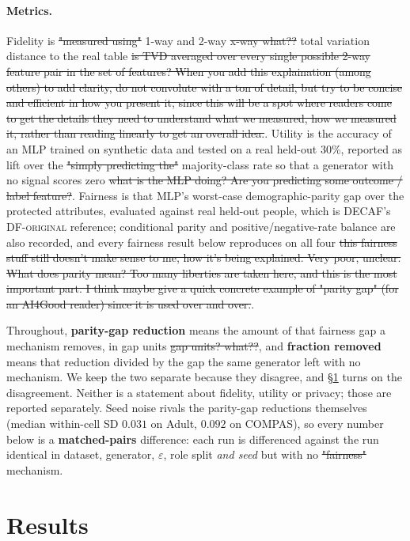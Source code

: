 \documentclass{article}
\begin{document}
\paragraph{Metrics.}
Fidelity is \st{"measured using"} 1-way and 2-way \st{x-way what??} total variation distance to the real table \st{is TVD averaged over every single possible 2-way feature pair in the set of features? When you add this explaination (among others) to add clarity, do not convolute with a ton of detail, but try to be concise and efficient in how you present it, since this will be a spot where readers come to get the details they need to understand what we measured, how we measured it, rather than reading linearly to get an overall idea.}. Utility
is the accuracy of an MLP trained on synthetic data and tested on a real held-out
30\%, reported as lift over the \st{"simply predicting the"} majority-class rate so that a generator with no
signal scores zero \st{what is the MLP doing? Are you predicting some outcome / label feature?}. Fairness is that MLP's worst-case demographic-parity gap over
the protected attributes, evaluated against real held-out people, which is DECAF's
DF-\textsc{original} reference; conditional parity and positive/negative-rate
balance are also recorded, and every fairness result below reproduces on all four \st{this fairness stuff still doesn't make sense to me, how it's being explained. Very poor, unclear. What does parity mean? Too many liberties are taken here, and this is the most important part. I think maybe give a quick concrete example of "parity gap" (for an AI4Good reader) since it is used over and over.}.

Throughout, \textbf{parity-gap reduction} means the amount of that fairness gap a
mechanism removes, in gap units \st{gap units? what??}, and \textbf{fraction removed} means that
reduction divided by the gap the same generator left with no mechanism. We keep
the two separate because they disagree, and \S\ref{sec:results} turns on the
disagreement. Neither is a statement about fidelity, utility or privacy; those are
reported separately. Seed
noise rivals the parity-gap reductions themselves (median within-cell SD $0.031$
on Adult, $0.092$ on COMPAS), so every number below is a \textbf{matched-pairs}
difference:
each run is differenced against the run identical in dataset, generator,
$\varepsilon$, role split \emph{and seed} but with no \st{"fairness"} mechanism.

\section{Results}
\label{sec:results}
\end{document}
